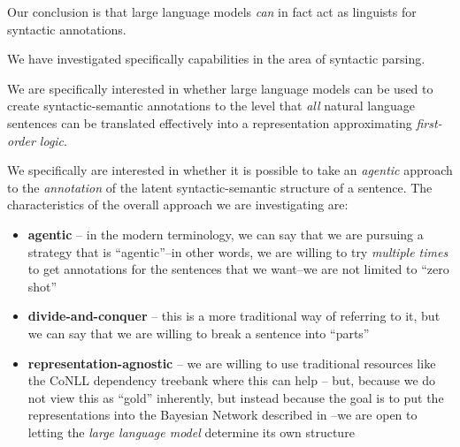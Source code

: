\label{sec:conclusion}

Our conclusion is that large language models {\em can} in fact act as linguists for syntactic annotations.

We have investigated specifically capabilities in the area of syntactic parsing.

We are specifically interested in whether large language models can be used to create syntactic-semantic annotations to the level that {\em all} natural language sentences can be translated effectively into a representation approximating {\em first-order logic}.

We specifically are interested in whether it is possible to take an {\em agentic} approach to the {\em annotation} of the latent syntactic-semantic structure of a sentence. The characteristics of the overall approach we are investigating are:
\begin{itemize}
    \item {\bf agentic} -- in the modern terminology, we can say that we are pursuing a strategy that is ``agentic''--in other words, we are willing to try {\em multiple times} to get annotations for the sentences that we want--we are not limited to ``zero shot''
    \item {\bf divide-and-conquer} -- this is a more traditional way of referring to it, but we can say that we are willing to break a sentence into ``parts''
    \item {\bf representation-agnostic} -- we are willing to use traditional resources like the CoNLL dependency treebank where this can help -- but, because we do not view this as ``gold'' inherently, but instead because the goal is to put the representations into the Bayesian Network described in \cite{coppola2024}--we are open to letting the {\em large language model} determine its own structure
\end{itemize}